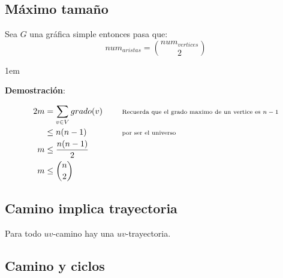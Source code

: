 \documentclass[12pt, fleqn]{report}                             %
\newenvironment{SmallIndentation}[1][0.75em]                    %
        {\begin{adjustwidth}{#1}{}\begin{footnotesize}}             %
        {\end{footnotesize}\end{adjustwidth}}                       %
\DeclareMathOperator \Space     {\quad}                         %
\newcommand \Remember[1]    {\Space\text{\scriptsize{#1}}}      %
\theoremstyle{break}                                            %
\begin{document}
            \subsection{Máximo tamaño}

                Sea $G$ una gráfica simple entonces pasa que:
                \begin{equation*}
                    num_{aristas} = {num_{vertices} \choose 2}
                \end{equation*}
                

                \begin{SmallIndentation}[1em]
                    \textbf{Demostración}:

                    
                    \begin{align*}
                        2m
                            &= \sum_{v \in V}{grado(v)}
                                && \Remember{Recuerda que el grado maximo de un vertice es $n -1$}    \\
                            &\leq n (n - 1)
                                && \Remember{por ser el universo}    \\
                            m &\leq \frac{n (n - 1)}{2} \\
                            m &\leq {n \choose 2}
                        \end{align*}


                \end{SmallIndentation}

            \subsection{Camino implica trayectoria}

                Para todo $uv$-camino hay una $uv$-trayectoria.

            \subsection{Camino y ciclos}
\end{document}
